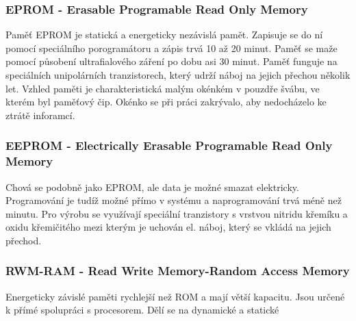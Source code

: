 \begin{multicols}{2}
    \subsubsection{EPROM - Erasable Programable Read Only Memory}
    Paměť EPROM je statická a energeticky nezávislá pamět.
    Zapisuje se do ní pomocí speciálního porogramátoru a zápis trvá 10 až 20 minut.
    Paměť se maže pomocí působení ultrafialového záření po dobu asi 30 minut.
    Paměť funguje na speciálních unipolárních tranzistorech, který udrží náboj na jejich přechou několik let.
    Vzhled paměti je charakteristická malým okénkém v pouzdře švábu, ve kterém byl paměťový čip.
    Okénko se při práci zakrývalo, aby nedocházelo ke ztrátě inforamcí.
    \columnbreak
    \subsubsection{EEPROM - Electrically Erasable Programable Read Only Memory}
    Chová se podobně jako EPROM, ale data je možné smazat elektricky.
    Programování je tudíž možné přímo v systému a naprogramování trvá méně než minutu.
    Pro výrobu se využívají speciální tranzistory s vrstvou nitridu křemíku a oxidu křemičitého mezi kterým je uchován el. náboj, který se vkládá na jejich přechod.\\
\end{multicols}

\subsubsection{RWM-RAM - Read Write Memory-Random Access Memory}
Energeticky závislé paměti rychlejší než ROM a mají větší kapacitu.
Jsou určené k přímé spolupráci s procesorem.
Dělí se na dynamické a statické
